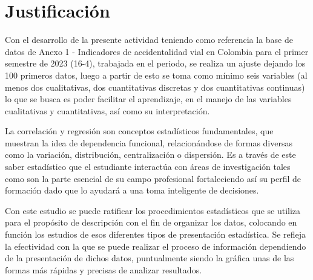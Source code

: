 \section*{Justificaci\'on}
Con el desarrollo de la presente actividad teniendo como referencia la base de datos de  Anexo 1 - Indicadores de accidentalidad vial en Colombia para el primer semestre de 2023 (16-4), trabajada en el periodo, se realiza un ajuste dejando los 100 primeros datos,  luego a partir de esto se toma como mínimo seis variables (al menos dos cualitativas, dos cuantitativas discretas y dos cuantitativas continuas) lo que se busca es poder facilitar el aprendizaje, en el  manejo de las variables cualitativas y cuantitativas, así como  su interpretación.\par
La correlación y regresión son conceptos estadísticos fundamentales, que muestran la idea de dependencia funcional, relacionándose de formas diversas como la variación, distribución, centralización o dispersión. Es a través de este saber estadístico que el estudiante interactúa con áreas de investigación tales como son la parte esencial de su campo profesional fortaleciendo así su perfil de formación dado que lo ayudará a una toma inteligente de decisiones.\par
Con este estudio se puede ratificar los procedimientos estadísticos que se utiliza para el propósito de descripción con el fin de organizar los datos, colocando en función los estudios de esos diferentes tipos de presentación estadística. Se refleja la efectividad con la que se puede realizar el proceso de información dependiendo de la presentación de dichos datos, puntualmente siendo la gráfica unas de las formas más rápidas y precisas de analizar resultados.